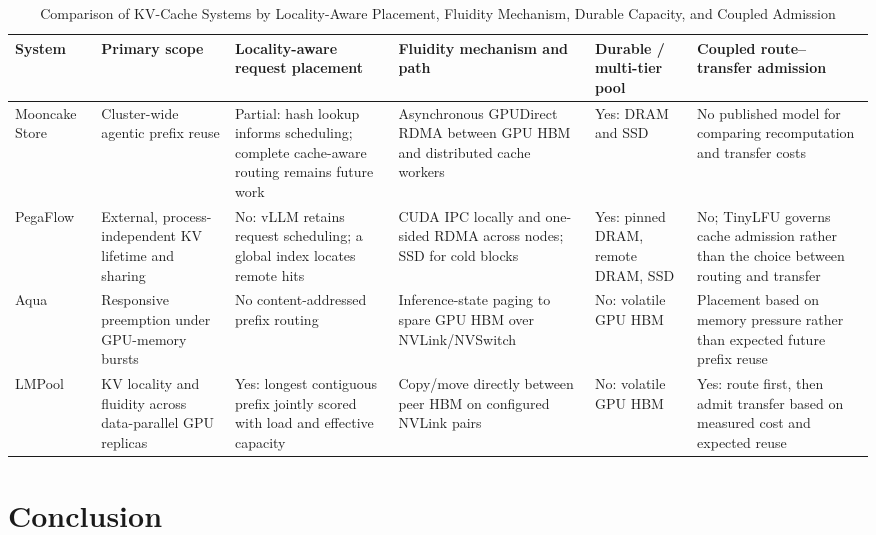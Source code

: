 \documentclass{article}
\newcommand{\sys}{LMPool}
\begin{document}
\begin{table}[t]
  \caption{Comparison of KV-Cache Systems by Locality-Aware Placement, Fluidity Mechanism, Durable Capacity, and Coupled Admission}
  \label{tab:related-principles}
  \centering
  \small
  \setlength{\tabcolsep}{3pt}
  \begin{tabular}{L{0.12\textwidth}L{0.15\textwidth}L{0.17\textwidth}L{0.20\textwidth}L{0.12\textwidth}L{0.17\textwidth}}
    \toprule
    System & Primary scope & Locality-aware request placement & Fluidity mechanism and path & Durable / multi-tier pool & Coupled route--transfer admission \\
    \midrule
    Mooncake Store~\citep{MooncakeStore}
      & Cluster-wide agentic prefix reuse
      & Partial: hash lookup informs scheduling; complete cache-aware routing remains future work
      & Asynchronous GPUDirect RDMA between GPU HBM and distributed cache workers
      & Yes: DRAM and SSD
      & No published model for comparing recomputation and transfer costs \\
    PegaFlow~\citep{PegaFlow}
      & External, process-independent KV lifetime and sharing
      & No: vLLM retains request scheduling; a global index locates remote hits
      & CUDA IPC locally and one-sided RDMA across nodes; SSD for cold blocks
      & Yes: pinned DRAM, remote DRAM, SSD
      & No; TinyLFU governs cache admission rather than the choice between routing and transfer \\
    Aqua~\citep{Aqua}
      & Responsive preemption under GPU-memory bursts
      & No content-addressed prefix routing
      & Inference-state paging to spare GPU HBM over NVLink/NVSwitch
      & No: volatile GPU HBM
      & Placement based on memory pressure rather than expected future prefix reuse \\
    \sys{}
      & KV locality and fluidity across data-parallel GPU replicas
      & Yes: longest contiguous prefix jointly scored with load and effective capacity
      & Copy/move directly between peer HBM on configured NVLink pairs
      & No: volatile GPU HBM
      & Yes: route first, then admit transfer based on measured cost and expected reuse \\
    \bottomrule
  \end{tabular}
\end{table}

\section{Conclusion}
\label{sec:concl}
\end{document}
